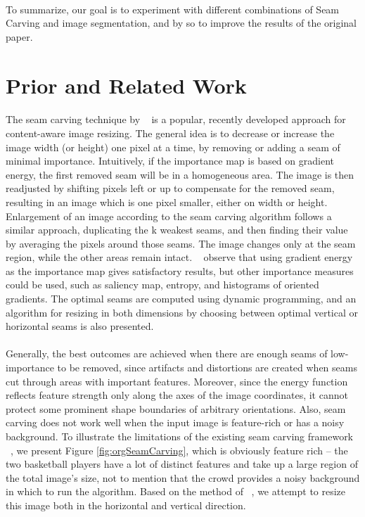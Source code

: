 \documentclass[conference]{acmsiggraph}
\begin{document}
\paragraph{}
To summarize, our goal is to experiment with different combinations of Seam Carving and image segmentation, and by so to improve the results of the original paper.


\section{Prior and Related Work}

\paragraph{}
The seam carving technique by ~\cite{Avidan2007} is a popular, recently developed approach for content-aware image resizing. The general idea is to decrease or increase the image width (or height) one pixel at a time,  by removing or adding a seam of minimal importance. Intuitively, if the importance map is based on gradient energy, the first removed seam will be in a homogeneous area. The image is then readjusted by shifting pixels left or up to compensate for the removed seam, resulting in an image which is one pixel smaller, either on width or height. Enlargement of an image according to the seam carving algorithm follows a similar approach, duplicating the k weakest seams, and then finding their value by averaging the pixels around those seams. The image changes only at the seam region, while the other areas remain intact. ~\cite{Avidan2007} observe that using gradient energy as the importance map gives satisfactory results, but other importance measures could be used, such as saliency map, entropy, and histograms of oriented gradients. The optimal seams are computed using dynamic programming, and an algorithm for resizing in both dimensions by choosing between optimal vertical or horizontal seams is also presented. 

\paragraph{}
Generally, the best outcomes are achieved when there are enough seams of low-importance to be removed, since artifacts and distortions are created when seams cut through areas with important features. Moreover, since the energy function reflects feature strength only along the axes  of the image coordinates, it cannot protect some prominent shape boundaries of arbitrary orientations. Also, seam carving does not work well when the input image is feature-rich or has a noisy background. To illustrate the limitations of the existing seam carving framework ~\cite{Avidan2007}, we present Figure \ref{fig:orgSeamCarving}, which is obviously feature rich -- the two basketball players have a lot of distinct features and take up a large region of the total image's size, not to mention that the crowd provides a noisy background in which to run the algorithm. Based on the method of ~\cite{Avidan2007}, we attempt to resize this image both in the horizontal and vertical direction.
\end{document}
